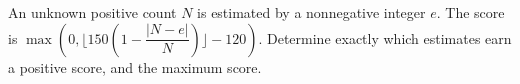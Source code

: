 An unknown positive count $N$ is estimated by a nonnegative integer $e$. The score is $\max(0,\lfloor150(1-\dfrac{|N-e|}{N})\rfloor-120)$. Determine exactly which estimates earn a positive score, and the maximum score.
